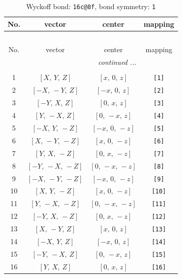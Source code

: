 \documentclass[fleqn,8pt]{jsarticle}
\begin{document}
\begin{longtable}{cccc}
\caption{Wyckoff bond: {\tt 16c@8f}, bond symmetry: {\tt 1}}
 \\
 \hline \hline
No. & vector & center & mapping \\ \hline \endfirsthead

\multicolumn{3}{l}{\tablename\ \thetable{}} \\
 \hline \hline
No. & vector & center & mapping \\ \hline \endhead

 \hline \hline
\multicolumn{3}{r}{\footnotesize\it continued ...} \\ \endfoot

 \hline \hline
\multicolumn{3}{r}{} \\ \endlastfoot

1 & $\left[ X,\, Y,\, Z \right]$ & $\left[ x,\, 0,\, z \right]$ & {\tt [1]} \\ \hline
2 & $\left[ - X,\, - Y,\, Z \right]$ & $\left[ - x,\, 0,\, z \right]$ & {\tt [2]} \\ \hline
3 & $\left[ - Y,\, X,\, Z \right]$ & $\left[ 0,\, x,\, z \right]$ & {\tt [3]} \\ \hline
4 & $\left[ Y,\, - X,\, Z \right]$ & $\left[ 0,\, - x,\, z \right]$ & {\tt [4]} \\ \hline
5 & $\left[ - X,\, Y,\, - Z \right]$ & $\left[ - x,\, 0,\, - z \right]$ & {\tt [5]} \\ \hline
6 & $\left[ X,\, - Y,\, - Z \right]$ & $\left[ x,\, 0,\, - z \right]$ & {\tt [6]} \\ \hline
7 & $\left[ Y,\, X,\, - Z \right]$ & $\left[ 0,\, x,\, - z \right]$ & {\tt [7]} \\ \hline
8 & $\left[ - Y,\, - X,\, - Z \right]$ & $\left[ 0,\, - x,\, - z \right]$ & {\tt [8]} \\ \hline
9 & $\left[ - X,\, - Y,\, - Z \right]$ & $\left[ - x,\, 0,\, - z \right]$ & {\tt [9]} \\ \hline
10 & $\left[ X,\, Y,\, - Z \right]$ & $\left[ x,\, 0,\, - z \right]$ & {\tt [10]} \\ \hline
11 & $\left[ Y,\, - X,\, - Z \right]$ & $\left[ 0,\, - x,\, - z \right]$ & {\tt [11]} \\ \hline
12 & $\left[ - Y,\, X,\, - Z \right]$ & $\left[ 0,\, x,\, - z \right]$ & {\tt [12]} \\ \hline
13 & $\left[ X,\, - Y,\, Z \right]$ & $\left[ x,\, 0,\, z \right]$ & {\tt [13]} \\ \hline
14 & $\left[ - X,\, Y,\, Z \right]$ & $\left[ - x,\, 0,\, z \right]$ & {\tt [14]} \\ \hline
15 & $\left[ - Y,\, - X,\, Z \right]$ & $\left[ 0,\, - x,\, z \right]$ & {\tt [15]} \\ \hline
16 & $\left[ Y,\, X,\, Z \right]$ & $\left[ 0,\, x,\, z \right]$ & {\tt [16]} \\
\end{longtable}
\end{document}
